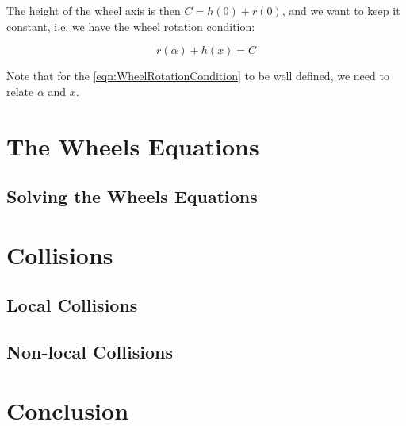 \documentclass[]{article}
\begin{document}
	The height of the wheel axis is then $C = h(0)+r(0)$, and we want to keep it constant, i.e. we have the wheel rotation condition:
	
	\begin{equation}
		\tag{Wheel Rotation Condition}
		r(\alpha)+h(x)=C
		\label{eqn:WheelRotationCondition}
	\end{equation}
	
	Note that for the \eqref{eqn:WheelRotationCondition} to be well defined, we need to relate $\alpha$ and $x$.
	
	
	\section{The Wheels Equations}
	\subsection{Solving the Wheels Equations}
	
	\section{Collisions}
	\subsection{Local Collisions}
	\subsection{Non-local Collisions}
	
	\section{Conclusion}
	
\end{document}
